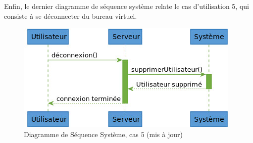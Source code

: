 Enfin, le dernier diagramme de séquence système relate le cas d'utilisation
5, qui consiste à se déconnecter du bureau virtuel.

\begin{figure}[h!]
	\centering
	\includegraphics[scale=0.4]{diagrammes/dss5.jpg}
	\caption{\color{green}Diagramme de Séquence Système, cas 5 (mis à jour)\color{black}}
\end{figure}
